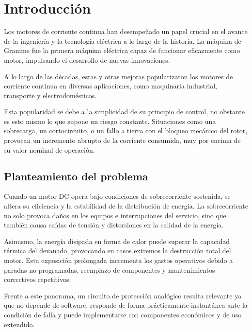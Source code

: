 \documentclass[conference]{IEEEtran}
\begin{document}
\section{Introducción}
Los motores de corriente continua han desempeñado un papel crucial en el avance de la ingeniería y la tecnología eléctrica a lo largo de la historia. La máquina de Gramme fue la primera máquina eléctrica capaz de funcionar eficazmente como motor, impulsando el desarrollo de nuevas innovaciones.

A lo largo de las décadas, estas y otras mejoras popularizaron los motores de corriente continua en diversas aplicaciones, como maquinaria industrial, transporte y electrodomésticos.

Esta popularidad se debe a la simplicidad de su principio de control, no obstante es esto mismo lo que supone un riesgo constante. Situaciones como una sobrecarga, un cortocircuito, o un fallo a tierra con el bloqueo mecánico del rotor, provocan un incremento abrupto de la corriente consumida, muy por encima de su valor nominal de operación.

\subsection{Planteamiento del problema}
Cuando un motor DC opera bajo condiciones de sobrecorriente sostenida, se altera su eficiencia y la estabilidad de la distribución de energía. La sobrecorriente no solo provoca daños en los equipos e interrupciones del servicio, sino que también causa caídas de tensión y distorsiones en la calidad de la energía.

Asimismo, la energía disipada en forma de calor puede superar la capacidad térmica del devanado, provocando en casos extremos la destrucción total del motor. 
Esta exposición prolongada incrementa los gastos operativos debido a paradas no programadas, reemplazo de componentes y mantenimientos correctivos repetitivos.

Frente a este panorama, un circuito de protección analógico resulta relevante ya que no depende de software, responde de forma prácticamente instantánea ante la condición de falla y puede implementarse con componentes económicos y de uso extendido.
\end{document}
